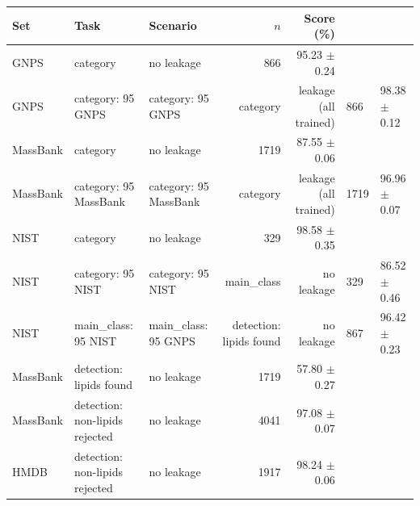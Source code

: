 \begin{tabular}{lllrr}
\toprule
Set & Task & Scenario & $n$ & Score (\%) \\
\midrule
GNPS & category & no leakage & 866 & 95.23 $\pm$ 0.24 \\
GNPS & category: 95 %
GNPS & category: 95 %
GNPS & category & leakage (all trained) & 866 & 98.38 $\pm$ 0.12 \\
MassBank & category & no leakage & 1719 & 87.55 $\pm$ 0.06 \\
MassBank & category: 95 %
MassBank & category: 95 %
MassBank & category & leakage (all trained) & 1719 & 96.96 $\pm$ 0.07 \\
NIST & category & no leakage & 329 & 98.58 $\pm$ 0.35 \\
NIST & category: 95 %
NIST & category: 95 %
NIST & main_class & no leakage & 329 & 86.52 $\pm$ 0.46 \\
NIST & main_class: 95 %
NIST & main_class: 95 %
GNPS & detection: lipids found & no leakage & 867 & 96.42 $\pm$ 0.23 \\
MassBank & detection: lipids found & no leakage & 1719 & 57.80 $\pm$ 0.27 \\
MassBank & detection: non-lipids rejected & no leakage & 4041 & 97.08 $\pm$ 0.07 \\
HMDB & detection: non-lipids rejected & no leakage & 1917 & 98.24 $\pm$ 0.06 \\
\bottomrule
\end{tabular}
